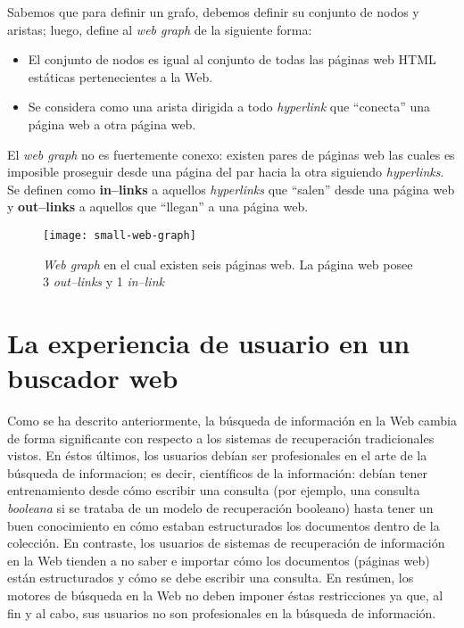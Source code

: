 	Sabemos que para definir un grafo, debemos definir su conjunto de nodos y aristas; luego, \cite{manning2009} define al \textit{web graph} de la siguiente forma:
	\begin{itemize}
		\item El conjunto de nodos es igual al conjunto de todas las páginas web HTML estáticas pertenecientes a la Web.
		\item Se considera como una arista dirigida a todo \textit{hyperlink} que \enquote{conecta} una página web a otra página web.
	\end{itemize}
	El \textit{web graph} no es fuertemente conexo: existen pares de páginas web las cuales es imposible proseguir desde una página del par hacia la otra siguiendo \textit{hyperlinks}. Se definen como \textbf{in--links} a aquellos \textit{hyperlinks} que \enquote{salen} desde una página web y \textbf{out--links} a aquellos que \enquote{llegan} a una página web.
	
	\begin{figure}[h]
		\texttt{[image: small-web-graph]}
		\centering
		\caption{\textit{Web graph} en el cual existen seis páginas web. La página web posee 3 \textit{out--links} y 1 \textit{in--link}}
	\end{figure}
	
\section{La experiencia de usuario en un buscador web}
	Como se ha descrito anteriormente, la búsqueda de información en la Web cambia de forma significante con respecto a los sistemas de recuperación tradicionales vistos. En éstos últimos, los usuarios debían ser profesionales en el arte de la búsqueda de informacion; es decir, científicos de la información: debían tener entrenamiento desde cómo escribir una consulta (por ejemplo, una consulta \textit{booleana} si se trataba de un modelo de recuperación booleano) hasta tener un buen conocimiento en cómo estaban estructurados los documentos dentro de la colección. En contraste, los usuarios de sistemas de recuperación de información en la Web tienden a no saber e importar cómo los documentos (páginas web) están estructurados y cómo se debe escribir una consulta. En resúmen, los motores de búsqueda en la Web no deben imponer éstas restricciones ya que, al fin y al cabo, sus usuarios no son profesionales en la búsqueda de información. \par
	
